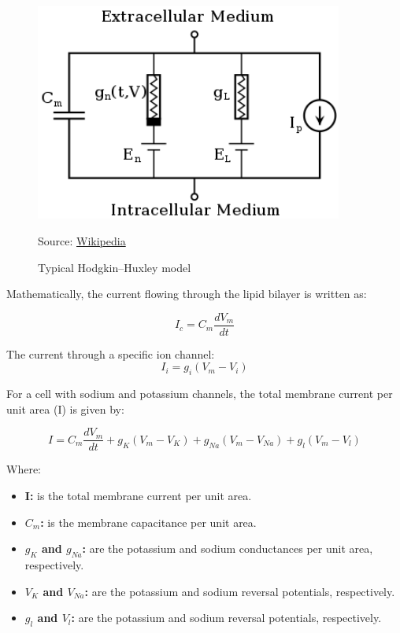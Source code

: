 \documentclass[paper=a4, fontsize=11pt]{scrartcl} %
\numberwithin{equation}{section} %
\numberwithin{figure}{section} %
\numberwithin{table}{section} %
\begin{document}
\begin{figure}[h]
    \centering
    \includegraphics[width=0.9\textwidth]{./data/Hodgkin-Huxley.png}
    \caption{Typical Hodgkin–Huxley model}
    \label{fig:my_picture}
    \vspace{1pt} %
    \small{Source: \href{https://en.wikipedia.org/wiki/Hodgkin%E2%80%93Huxley_model}{Wikipedia}}
\end{figure}

\vspace{10pt}
Mathematically, the current flowing through the lipid bilayer is written as:

\begin{equation}
    I_{c} = C_{m} \frac{dV_{m}}{dt} 
\end{equation}

The current through a specific ion channel:
\begin{equation}
    I_{i} = g_{i} (V_{m} - V_{i}) 
\end{equation}


For a cell with sodium and potassium channels, the total membrane current per unit area (I) is given by:

\begin{equation}
    I = C_{m} \frac{dV_{m}}{dt} + g_{K} (V_{m} - V_{K}) + g_{Na} (V_{m} - V_{Na}) + g_{l} (V_{m} - V_{l})
\end{equation}


Where:

\begin{itemize}
    \item \textbf{ I:} is the total membrane current per unit area.
    \item \textbf{$C_{m}$:} is the membrane capacitance per unit area.
    \item \textbf{ $g_{K}$ and $g_{Na}$:} are the potassium and sodium conductances per unit area, respectively.
    \item \textbf{$V_{K}$ and $V_{Na}$:} are the potassium and sodium reversal potentials, respectively.
    \item \textbf{$g_{l}$ and $V_{l}$:} are the potassium and sodium reversal potentials, respectively.
\end{itemize}
\end{document}
